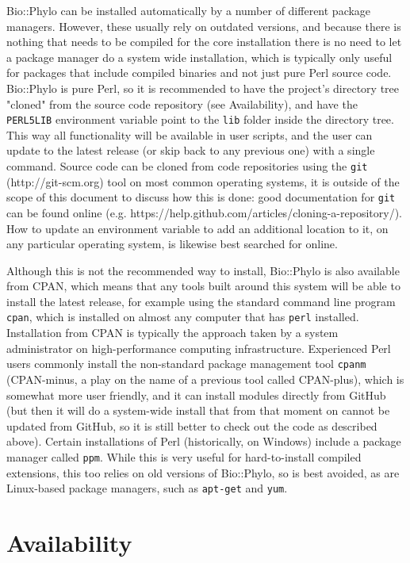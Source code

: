 \documentclass{bioinfo}
\begin{document}
Bio::Phylo can be installed automatically by a number of different package managers. 
However, these usually rely on outdated versions, and because there is nothing that needs 
to be compiled for the core installation there is no need to let a package manager do a 
system wide installation, which is typically only useful for packages that include 
compiled binaries and not just pure Perl source code. Bio::Phylo is pure Perl, so it is 
recommended to have the project's directory tree "cloned" from the source code repository 
(see Availability), and have the \texttt{PERL5LIB} environment variable point to the 
\texttt{lib} folder inside the directory tree. This way all functionality will be 
available in user scripts, and the user can update to the latest release (or skip back to 
any previous one) with a single command. Source code can be cloned from code repositories
using the \texttt{git} (http://git-scm.org) tool on most common operating systems, it is 
outside of the scope of this document to discuss how this is done: good documentation for 
\texttt{git} can be found online (e.g. 
https://help.github.com/articles/cloning-a-repository/). How to update an environment 
variable to add an additional location to it, on any particular operating system, is 
likewise best searched for online.

Although this is not the recommended way to install, Bio::Phylo is also available from 
CPAN, which means that any tools built around this system will be able to install the 
latest release, for example using the standard command line program \texttt{cpan}, which 
is installed on almost any computer that has \texttt{perl} installed. Installation from 
CPAN is typically the approach taken by a system administrator on high-performance 
computing infrastructure. Experienced Perl users commonly install the non-standard package 
management tool \texttt{cpanm} (CPAN-minus, a play on the name of a previous tool called 
CPAN-plus), which is somewhat more user friendly, and it can install modules directly from 
GitHub (but then it will do a system-wide install that from that moment on cannot be 
updated from GitHub, so it is still better to check out the code as described above). 
Certain installations of Perl (historically, on Windows) include a package manager called 
\texttt{ppm}. While this is very useful for hard-to-install compiled extensions, this too 
relies on old versions of Bio::Phylo, so is best avoided, as are Linux-based package 
managers, such as \texttt{apt-get} and \texttt{yum}.

\section{Availability}
\end{document}
